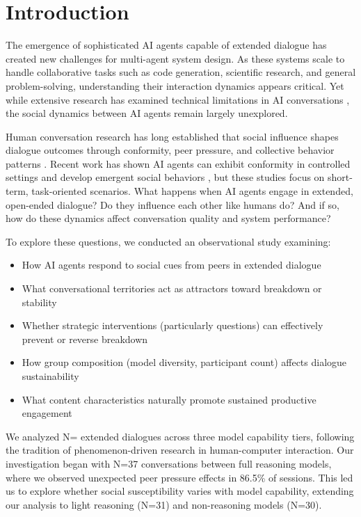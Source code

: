 \documentclass[11pt,letterpaper]{article}
\newcommand{\exponedataTotalSessionsRaw}{37}
\newcommand{\exponedataTotalSessions}{N=\exponedataTotalSessionsRaw}
\newcommand{\exponedataPeerPressurePercentage}{86.5\%}
\newcommand{\exptwoTotalSessionsRaw}{31}
\newcommand{\exptwoTotalSessions}{N=\exptwoTotalSessionsRaw}
\newcommand{\expthreeTotalSessionsRaw}{30}
\newcommand{\expthreeTotalSessions}{N=\expthreeTotalSessionsRaw}
\newcommand{\totalAllPhasesRaw}{\fpeval{\exponedataTotalSessionsRaw + \exptwoTotalSessionsRaw + \expthreeTotalSessionsRaw}}
\newcommand{\totalAllPhases}{N=\totalAllPhasesRaw}
\begin{document}
\section{Introduction}

The emergence of sophisticated AI agents capable of extended dialogue has created new challenges for multi-agent system design. As these systems scale to handle collaborative tasks such as code generation, scientific research, and general problem-solving, understanding their interaction dynamics appears critical. Yet while extensive research has examined technical limitations in AI conversations \citep{laban2025lost}, the social dynamics between AI agents remain largely unexplored.

Human conversation research has long established that social influence shapes dialogue outcomes through conformity, peer pressure, and collective behavior patterns \citep{asch1956studies}. Recent work has shown AI agents can exhibit conformity in controlled settings \citep{kyrlitsias2018conformity} and develop emergent social behaviors \citep{ashery2025emergent}, but these studies focus on short-term, task-oriented scenarios. What happens when AI agents engage in extended, open-ended dialogue? Do they influence each other like humans do? And if so, how do these dynamics affect conversation quality and system performance?

To explore these questions, we conducted an observational study examining:
\begin{itemize}
    \item How AI agents respond to social cues from peers in extended dialogue
    \item What conversational territories act as attractors toward breakdown or stability
    \item Whether strategic interventions (particularly questions) can effectively prevent or reverse breakdown
    \item How group composition (model diversity, participant count) affects dialogue sustainability
    \item What content characteristics naturally promote sustained productive engagement
\end{itemize}

We analyzed \totalAllPhases{} extended dialogues across three model capability tiers, following the tradition of phenomenon-driven research in human-computer interaction. Our investigation began with \exponedataTotalSessions{} conversations between full reasoning models, where we observed unexpected peer pressure effects in \exponedataPeerPressurePercentage{} of sessions. This led us to explore whether social susceptibility varies with model capability, extending our analysis to light reasoning (\exptwoTotalSessions{}) and non-reasoning models (\expthreeTotalSessions{}).
\end{document}
